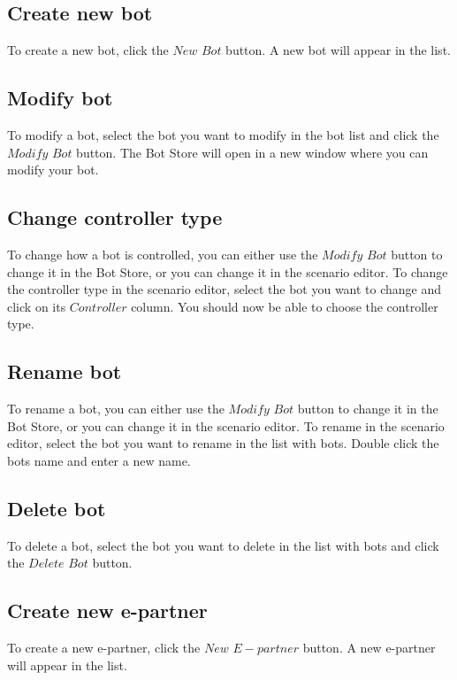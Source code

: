 \documentclass[a4paper]{article}
\begin{document}
\subsection{Create new bot}
To create a new bot, click the $New$ $Bot$ button. A new bot will appear in the list.%

\subsection{Modify bot}
To modify a bot, select the bot you want to modify in the bot list and click the $Modify$ $Bot$ button. The Bot Store will open in a new window where you can modify your bot.

\subsection{Change controller type}
To change how a bot is controlled, you can either use the $Modify$ $Bot$ button to change it in the Bot Store, or you can change it in the scenario editor. To change the controller type in the scenario editor, select the bot you want to change and click on its $Controller$ column. You should now be able to choose the controller type.

\subsection{Rename bot}
To rename a bot, you can either use the $Modify$ $Bot$ button to change it in the Bot Store, or you can change it in the scenario editor. To rename in the scenario editor, select the bot you want to rename in the list with bots. Double click the bots name and enter a new name. %

\subsection{Delete bot}
To delete a bot, select the bot you want to delete in the list with bots and click the $Delete$ $Bot$ button.

\subsection{Create new e-partner}
To create a new e-partner, click the $New$ $E-partner$ button. A new e-partner will appear in the list.%
\end{document}
